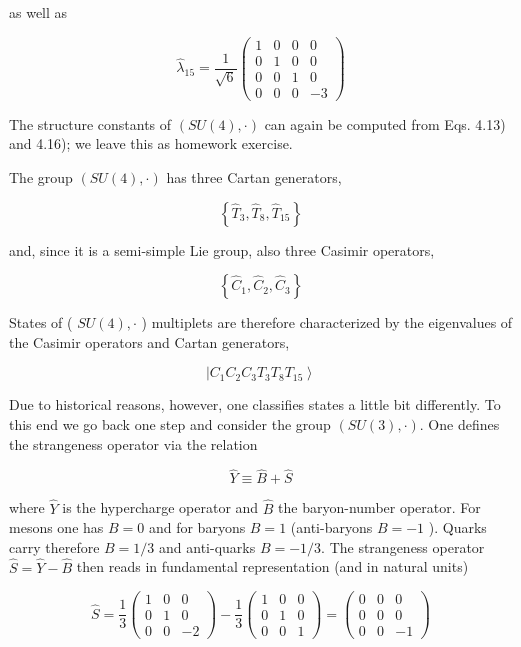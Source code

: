 \documentclass[10pt, letterpaper]{article}
\begin{document}
as well as

$$
\hat{\lambda}_{15}=\frac{1}{\sqrt{6}}\left(\begin{array}{cccc}
1 & 0 & 0 & 0 \\
0 & 1 & 0 & 0 \\
0 & 0 & 1 & 0 \\
0 & 0 & 0 & -3
\end{array}\right)
$$

The structure constants of $(S U(4), \cdot)$ can again be computed from Eqs. 4.13) and 4.16); we leave this as homework exercise.

The group $(S U(4), \cdot)$ has three Cartan generators,

$$
\left\{\hat{T}_{3}, \hat{T}_{8}, \hat{T}_{15}\right\}
$$

and, since it is a semi-simple Lie group, also three Casimir operators,

$$
\left\{\hat{C}_{1}, \hat{C}_{2}, \hat{C}_{3}\right\}
$$

States of ( $S U(4), \cdot$ ) multiplets are therefore characterized by the eigenvalues of the Casimir operators and Cartan generators,

$$
\left|C_{1} C_{2} C_{3} T_{3} T_{8} T_{15}\right\rangle
$$

Due to historical reasons, however, one classifies states a little bit differently. To this end we go back one step and consider the group $(S U(3), \cdot)$. One defines the strangeness operator via the relation

$$
\hat{Y} \equiv \hat{B}+\hat{S}
$$

where $\hat{Y}$ is the hypercharge operator and $\hat{B}$ the baryon-number operator. For mesons one has $B=0$ and for baryons $B=1$ (anti-baryons $B=-1$ ). Quarks carry therefore $B=1 / 3$ and anti-quarks $B=-1 / 3$. The strangeness operator $\hat{S}=\hat{Y}-\hat{B}$ then reads in fundamental representation (and in natural units)

$$
\hat{S}=\frac{1}{3}\left(\begin{array}{ccc}
1 & 0 & 0 \\
0 & 1 & 0 \\
0 & 0 & -2
\end{array}\right)-\frac{1}{3}\left(\begin{array}{ccc}
1 & 0 & 0 \\
0 & 1 & 0 \\
0 & 0 & 1
\end{array}\right)=\left(\begin{array}{ccc}
0 & 0 & 0 \\
0 & 0 & 0 \\
0 & 0 & -1
\end{array}\right)
$$
\end{document}
